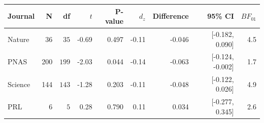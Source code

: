 \begin{tabular}{lrrrrrrrr}
\toprule
\textbf{Journal} & \textbf{N} & \textbf{df} & \textbf{$t$} & \textbf{P-value} & \textbf{$d_z$} & \textbf{Difference} & \textbf{95\% CI} & \textbf{$BF_{01}$} \\
\midrule
Nature & 36 & $35$ & -0.69 & 0.497 & -0.11 & -0.046 & [-0.182, 0.090] & 4.5 \\
PNAS & 200 & $199$ & -2.03 & 0.044 & -0.14 & -0.063 & [-0.124, -0.002] & 1.7 \\
Science & 144 & $143$ & -1.28 & 0.203 & -0.11 & -0.048 & [-0.122, 0.026] & 4.9 \\
PRL & 6 & $5$ & 0.28 & 0.790 & 0.11 & 0.034 & [-0.277, 0.345] & 2.6 \\
\bottomrule
\end{tabular}%
